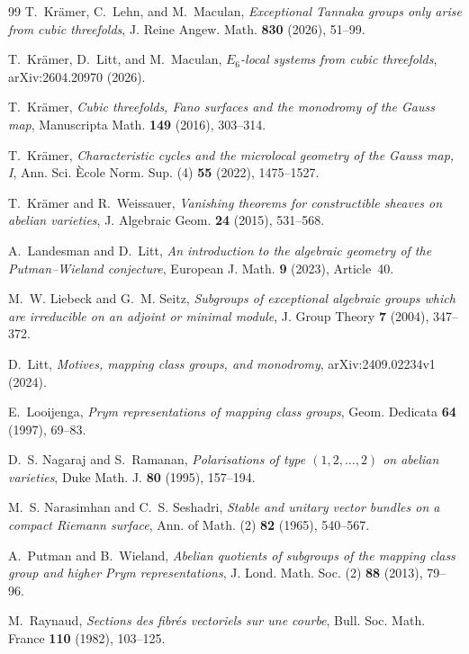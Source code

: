 \documentclass[11pt,reqno]{amsart}
\numberwithin{equation}{section}
\theoremstyle{definition}
\theoremstyle{remark}
\begin{document}
\begin{thebibliography}{99}
T.~Kr\"amer, C.~Lehn, and M.~Maculan,
\emph{Exceptional Tannaka groups only arise from cubic threefolds},
J. Reine Angew. Math. \textbf{830} (2026), 51--99.

T.~Kr\"amer, D.~Litt, and M.~Maculan,
\emph{$E_6$-local systems from cubic threefolds},
arXiv:2604.20970 (2026).

T.~Kr\"amer,
\emph{Cubic threefolds, Fano surfaces and the monodromy of the Gauss map},
Manuscripta Math. \textbf{149} (2016), 303--314.

T.~Kr\"amer,
\emph{Characteristic cycles and the microlocal geometry of the Gauss map, I},
Ann. Sci. \`Ecole Norm. Sup. (4) \textbf{55} (2022), 1475--1527.

T.~Kr\"amer and R.~Weissauer,
\emph{Vanishing theorems for constructible sheaves on abelian varieties},
J. Algebraic Geom. \textbf{24} (2015), 531--568.

A.~Landesman and D.~Litt,
\emph{An introduction to the algebraic geometry of the Putman--Wieland conjecture},
European J. Math. \textbf{9} (2023), Article~40.

M.~W. Liebeck and G.~M. Seitz,
\emph{Subgroups of exceptional algebraic groups which are irreducible on an adjoint or minimal module},
J. Group Theory \textbf{7} (2004), 347--372.

D.~Litt,
\emph{Motives, mapping class groups, and monodromy},
arXiv:2409.02234v1 (2024).

E.~Looijenga,
\emph{Prym representations of mapping class groups},
Geom. Dedicata \textbf{64} (1997), 69--83.

D.~S. Nagaraj and S.~Ramanan,
\emph{Polarisations of type $(1,2,\ldots,2)$ on abelian varieties},
Duke Math. J. \textbf{80} (1995), 157--194.

M.~S. Narasimhan and C.~S. Seshadri,
\emph{Stable and unitary vector bundles on a compact Riemann surface},
Ann. of Math. (2) \textbf{82} (1965), 540--567.

A.~Putman and B.~Wieland,
\emph{Abelian quotients of subgroups of the mapping class group and higher Prym representations},
J. Lond. Math. Soc. (2) \textbf{88} (2013), 79--96.

M.~Raynaud,
\emph{Sections des fibr\'es vectoriels sur une courbe},
Bull. Soc. Math. France \textbf{110} (1982), 103--125.


\end{thebibliography}
\end{document}

